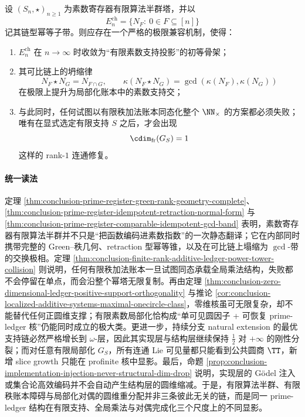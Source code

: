 


\begin{conjecture}[有限算法半群塔与局部化账本的极限兼容]\label{conj:conclusion-prime-register-semigroup-localization-limit-compatibility}
设 \((S_n,\star)_{n\ge 1}\) 为素数寄存器有限算法半群塔，并以
\[
E_n^{\mathrm{ch}}=\{N_F:\ 0\in F\subseteq[n]\}
\]
记其链型幂等子带。则应存在一个严格的极限兼容机制，使得：
\begin{enumerate}
\item \(E_n^{\mathrm{ch}}\) 在 \(n\to\infty\) 时收敛为“有限素数支持投影”的初等骨架；
\item 其可比链上的坍缩律
\[
N_F\star N_G=N_{F\cap G},
\qquad
\kappa(N_F\star N_G)=\gcd(\kappa(N_F),\kappa(N_G))
\]
在极限上提升为局部化账本中的素数支持交；
\item 与此同时，任何试图以有限秩加法账本同态化整个 \(\NN_{\times}\) 的方案都必须失败；唯有在显式选定有限支持 \(S\) 之后，才会出现
\[
\cdim_{\mathrm{fr}}(G_S)=1
\]
这样的 rank-\(1\) 连通修复。
\end{enumerate}
\end{conjecture}

\paragraph{统一读法}
定理 \ref{thm:conclusion-prime-register-green-rank-geometry-complete}、\ref{thm:conclusion-prime-register-idempotent-retraction-normal-form} 与 \ref{thm:conclusion-prime-register-comparable-idempotent-gcd-band} 表明，素数寄存器有限算法半群并不只是“把函数编码进素数指数”的一次静态翻译；它在内部同时携带完整的 Green--秩几何、retraction 型幂等锥，以及在可比链上塌缩为 \(\gcd\)-带的交换极相。定理 \ref{thm:conclusion-finite-rank-additive-ledger-power-tower-collision} 则说明，任何有限秩加法账本一旦试图同态承载全局乘法结构，失败都不会停留在单点，而会沿整个幂塔无限复制。再由定理 \ref{thm:conclusion-zero-dimensional-ledger-positive-support-orthogonality} 与推论 \ref{cor:conclusion-localized-additive-systems-maximal-onecircle-class}，零维核虽可无限复杂，却不能替代任何正圆维支撑；有限素数局部化恰构成“单可见圆因子 + 可恢复 prime-ledger 核”仍能同时成立的极大类。更进一步，持续分支 natural extension 的最优支持链必然严格增长到 \(\omega\)-层，因此其实现层与结构层继续保持 \(\frac12\) 对 \(+\infty\) 的刚性分裂；而对任意有限局部化 \(G_S\)，所有连通 Lie 可见量都只能看到公共圆商 \(\TT\)，新增 slice growth 只能在 profinite 核中显影。最后，命题 \ref{prop:conclusion-implementation-injection-never-structural-dim-drop} 说明，实现层的 Gödel 注入或集合论高效编码并不会自动产生结构层的圆维缩减。于是，有限算法半群、有限秩账本障碍与局部化对偶的圆维重分配并非三条彼此无关的链，而是同一 prime-ledger 结构在有限支持、全局乘法与对偶完成化三个尺度上的不同显影。

\endinput
